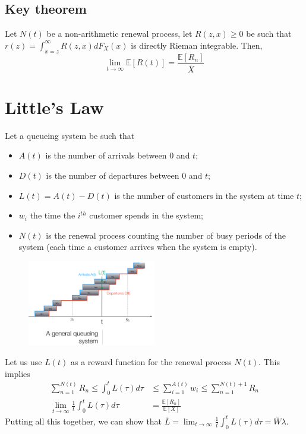 \documentclass[12pt, openany]{report}
\newcommand{\E}{\mathbb{E}}
\theoremstyle{definition}
\begin{document}
\subsection{Key theorem}
Let $N(t)$ be a non-arithmetic renewal process, let $R(z,x)\ge 0$ be such that $r(z)=\int_{x=z}^\infty R(z,x)dF_X(x)$ is directly Rieman integrable. Then, 
\begin{equation}
	\lim_{t\to \infty} \E[R(t)] = \frac{\E[R_n]}{\bar X}
\end{equation}
\section{Little's Law}
Let a queueing system be such that 
\begin{itemize}
	\item $A(t)$ is the number of arrivals between $0$ and $t$;
	\item $D(t)$ is the number of departures between $0$ and $t$;
	\item $L(t)=A(t)-D(t)$ is the number of customers in the system at time $t$;
	\item $w_i$ the time the $i^{th}$ customer spends in the system;
	\item $N(t)$ is the renewal process counting the number of busy periods of the system (each time a customer arrives when the system is empty).
\end{itemize}
\begin{figure}[H]
	\centering
	\includegraphics[width=0.5\textwidth]{img/queue.png}
\end{figure}
Let us use $L(t)$ as a reward function for the renewal process $N(t)$. This implies 
\begin{equation}
	\begin{aligned}
		\sum_{n=1}^{N(t)} R_n \le \int_0^t L(\tau)d\tau &\le \sum_{i=1}^{A(t)} w_i \le \sum_{n=1}^{N(t)+1} R_n\\
		\lim_{t\to \infty} \frac{1}{t}\int_0^t L(\tau)d\tau &= \frac{\E[R_n]}{\E[X]}	
	\end{aligned}
\end{equation}
Putting all this together, we can show that $\bar L=\lim_{t\to \infty}\frac{1}{t}\int_0^tL(\tau)d\tau = \bar  W\lambda$.
\end{document}
